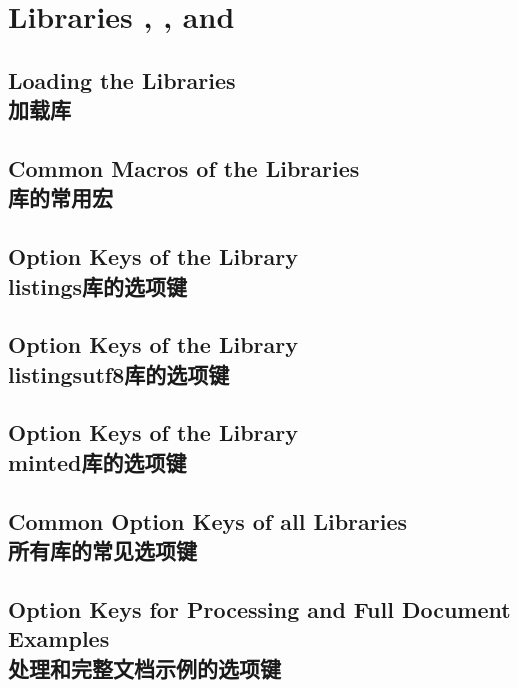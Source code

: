 \section{Libraries
  ,
  , and
  }\label{sec:listings}%
%

\subsection{Loading the Libraries\\加载库}


\subsection{Common Macros of the Libraries\\库的常用宏}

\subsection{Option Keys of the  Library\\listings库的选项键}\label{sec:speclistingkeys}

\subsection{Option Keys of the  Library\\listingsutf8库的选项键}

\subsection{Option Keys of the  Library\\minted库的选项键}

\subsection{Common Option Keys of all Libraries\\所有库的常见选项键}\label{sec:commonlistingkeys}

\subsection{Option Keys for Processing and Full Document Examples\\处理和完整文档示例的选项键}\label{sec:proclistingkeys}

